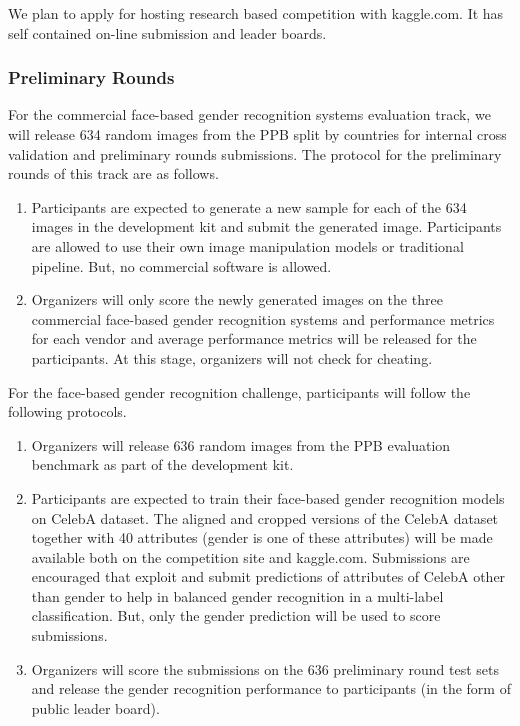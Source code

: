 \documentclass[11pt, oneside]{article}
\begin{document}
We plan to apply for hosting research based competition with kaggle.com. It has self contained on-line submission and leader boards.

\subsubsection{Preliminary Rounds}

For the commercial face-based gender recognition systems evaluation track, we will release 634 random images from the PPB split by countries for internal cross validation and preliminary rounds submissions. The protocol for the preliminary rounds of this track are as follows.

\begin{enumerate}
    \item Participants are expected to generate a new sample for each of the 634 images in the development kit and submit the generated image. Participants are allowed to use their own image manipulation models or traditional pipeline. But, no commercial software is allowed.
    \item Organizers will only score the newly generated images on the three commercial face-based gender recognition systems and performance metrics for each vendor and average performance metrics will be released for the participants. At this stage, organizers will not check for cheating.
\end{enumerate}

For the face-based gender recognition challenge, participants will follow the following protocols.

\begin{enumerate}
    \item Organizers will release 636 random images from the PPB evaluation benchmark as part of the development kit.
    \item Participants are expected to train their face-based gender recognition models on CelebA dataset. The aligned and cropped versions of the CelebA dataset together with 40 attributes (gender is one of these attributes) will be made available both on the competition site and kaggle.com. Submissions are encouraged that exploit and submit predictions of attributes of CelebA other than gender to help in balanced gender recognition in a multi-label classification. But, only the gender prediction will be used to score submissions.
    \item Organizers will score the submissions on the 636 preliminary round test sets and release the gender recognition performance to participants (in the form of public leader board).
\end{enumerate}
\end{document}
